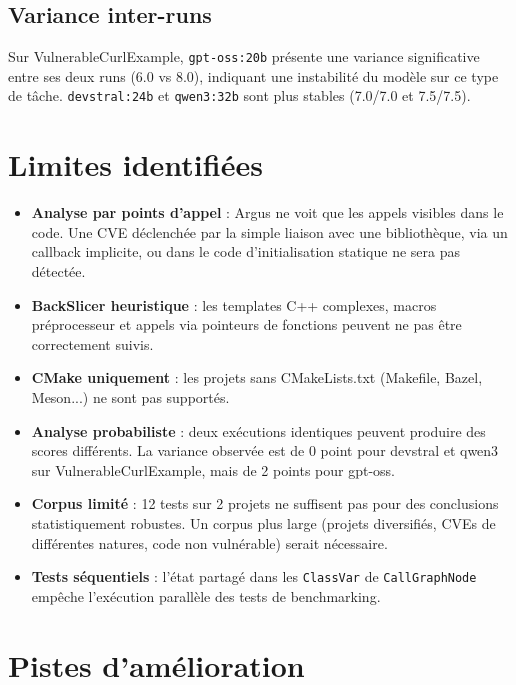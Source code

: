 \documentclass[a4paper, 12pt, hidelinks]{article}
\begin{document}
\subsection*{Variance inter-runs}

Sur VulnerableCurlExample, \texttt{gpt-oss:20b} présente une variance significative entre ses deux runs (6.0 vs 8.0), indiquant une instabilité du modèle sur ce type de tâche. \texttt{devstral:24b} et \texttt{qwen3:32b} sont plus stables (7.0/7.0 et 7.5/7.5).

\section{Limites identifiées}

\begin{itemize}
  \item \textbf{Analyse par points d'appel} : Argus ne voit que les appels visibles dans le code. Une CVE déclenchée par la simple liaison avec une bibliothèque, via un callback implicite, ou dans le code d'initialisation statique ne sera pas détectée.
  \item \textbf{BackSlicer heuristique} : les templates C++ complexes, macros préprocesseur et appels via pointeurs de fonctions peuvent ne pas être correctement suivis.
  \item \textbf{CMake uniquement} : les projets sans CMakeLists.txt (Makefile, Bazel, Meson...) ne sont pas supportés.
  \item \textbf{Analyse probabiliste} : deux exécutions identiques peuvent produire des scores différents. La variance observée est de 0 point pour devstral et qwen3 sur VulnerableCurlExample, mais de 2 points pour gpt-oss.
  \item \textbf{Corpus limité} : 12 tests sur 2 projets ne suffisent pas pour des conclusions statistiquement robustes. Un corpus plus large (projets diversifiés, CVEs de différentes natures, code non vulnérable) serait nécessaire.
  \item \textbf{Tests séquentiels} : l'état partagé dans les \texttt{ClassVar} de \texttt{CallGraphNode} empêche l'exécution parallèle des tests de benchmarking.
\end{itemize}

\section{Pistes d'amélioration}
\end{document}
